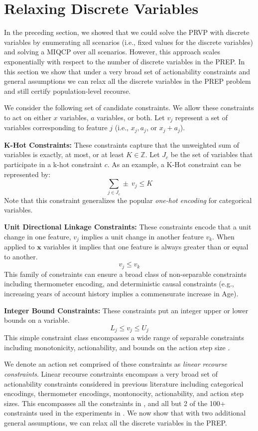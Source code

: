 \section{Relaxing Discrete Variables} \label{sec:scaling}
In the preceding section, we showed that we could solve the PRVP with discrete variables by enumerating all scenarios (i.e., fixed values for the discrete variables) and solving a MIQCP over all scenarios. However, this approach scales exponentially with respect to the number of discrete variables in the PREP. In this section we show that under a very broad set of actionability constraints and general assumptions we can relax all the discrete variables in the PREP problem and still certify population-level recourse.

We consider the following set of candidate constraints. We allow these constraints to act on either $x$ variables, $a$ variables, or both. Let $v_j$ represent a set of variables corresponding to feature $j$ (i.e., $x_j, a_j$, or $x_j+a_j$). 

\textbf{K-Hot Constraints:} These constraints capture that the unweighted sum of variables is exactly, at most, or at least $K \in \mathbb{Z}$. Let $J_c$ be the set of variables that participate in a k-hot constraint $c$. As an example, a K-Hot constraint can be represented by:
$$
\sum_{j \in J_c}  \pm~v_j \leq K
$$
Note that this constraint generalizes the popular \emph{one-hot encoding} for categorical variables.


\textbf{Unit Directional Linkage Constraints:} These constraints encode that a unit change in one feature, $v_{j}$ implies a unit change in another feature $v_{k}$. When applied to $\mathbf{x}$ variables it implies that one feature is always greater than or equal to another.
$$
v_{j} \leq v_{k}
$$
This family of constraints can ensure a broad class of non-separable constraints including thermometer encoding, and deterministic causal constraints (e.g., increasing years of account history implies a commensurate increase in Age). 

\textbf{Integer Bound Constraints:} These constraints put an integer upper or lower bounds on a variable. 
$$
L_j \leq  v_j \leq U_j
$$
This simple constraint class encompasses a wide range of separable constraints including monotonicity, actionability, and bounds on the action step size \cite{kothari2023prediction}.

We denote an action set comprised of these constraints as \textit{linear recourse constraints}. Linear recourse constraints encompass a very broad set of actionability constraints considered in previous literature including categorical encodings, thermometer encodings, montonocity, actionability, and action step sizes. This encompasses all the constraints in \citet{ustun2019actionable, russell2019efficient}, and all but 2 of the 100+ constraints used in the experiments in \citet{kothari2023prediction}. We now show that with two additional general assumptions, we can relax all the discrete variables in the PREP.

